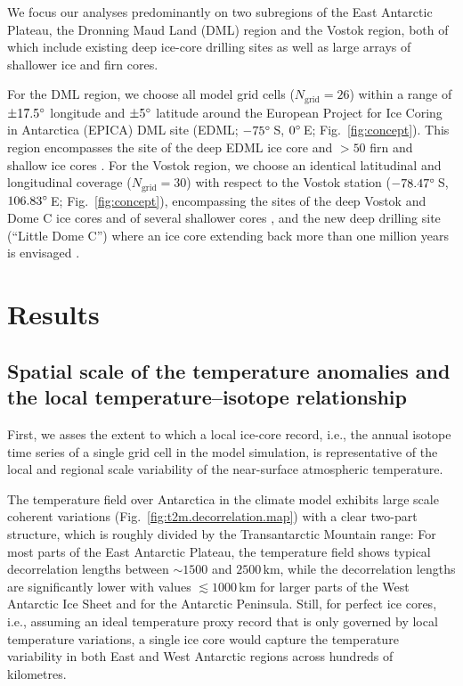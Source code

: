 \documentclass[cp, manuscript]{copernicus}
\begin{document}
We focus our analyses predominantly on two subregions of the East Antarctic
Plateau, the Dronning Maud Land (DML) region and the Vostok region, both of
which include existing deep ice-core drilling sites as well as large arrays of
shallower ice and firn cores.

For the DML region, we choose all model grid cells ($N_{\mathrm{grid}}=26$)
within a range of $\pm17.5^{\circ}$ longitude and $\pm5^{\circ}$
latitude around the European Project for Ice Coring in Antarctica (EPICA) DML
site (EDML; $-75^{\circ}$\,S, $0^{\circ}$\,E;
Fig.~\ref{fig:concept}). This region encompasses the site of the deep EDML ice
core \citep{EPICAcommunitymembers2006,awi2016} and $>50$ firn and shallow ice
cores \citep{Altnau2015}. For the Vostok region, we choose an identical
latitudinal and longitudinal coverage ($N_{\mathrm{grid}}=30$) with respect to
the Vostok station ($-78.47^{\circ}$\,S, $106.83^{\circ}$\,E;
Fig.~\ref{fig:concept}), encompassing the sites of the deep Vostok and Dome C
ice cores and of several shallower cores \citep{Stenni2017}, and the new deep
drilling site (``Little Dome C'') where an ice core extending back more than one
million years is envisaged \citep{Passalacqua2018}.

\section{Results}\label{results}

\subsection{Spatial scale of the temperature anomalies and the local
  temperature--isotope relationship}
\label{results:t2m-iso}

First, we asses the extent to which a local ice-core record, i.e., the annual
isotope time series of a single grid cell in the model simulation, is
representative of the local and regional scale variability of the near-surface
atmospheric temperature.

The temperature field over Antarctica in the climate model exhibits large scale
coherent variations (Fig.~\ref{fig:t2m.decorrelation.map}) with a clear two-part
structure, which is roughly divided by the Transantarctic Mountain range: For
most parts of the East Antarctic Plateau, the temperature field shows typical
decorrelation lengths between $\sim1500$ and $2500$\,km, while the decorrelation
lengths are significantly lower with values $\lesssim1000$\,km for larger parts
of the West Antarctic Ice Sheet and for the Antarctic Peninsula.  Still, for
perfect ice cores, i.e., assuming an ideal temperature proxy record that is only
governed by local temperature variations, a single ice core would capture the
temperature variability in both East and West Antarctic regions across hundreds
of kilometres.
\end{document}
